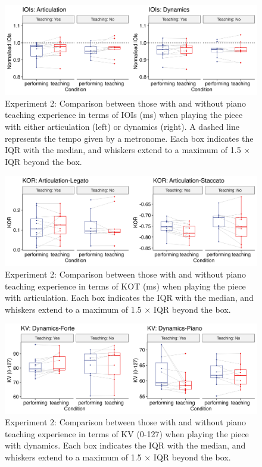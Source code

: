 \documentclass[
  man,floatsintext]{apa6}
\begin{document}
\begin{figure}
\includegraphics[width=1\linewidth]{manuscript_files/figure-latex/plot-ioi-teaching-2-1} \caption{\label{fig:ioi-teaching-2}Experiment 2: Comparison between those with and without piano teaching experience in terms of IOIs (ms) when playing the piece with either articulation (left) or dynamics (right). A dashed line represents the tempo given by a metronome. Each box indicates the IQR with the median, and whiskers extend to a maximum of 1.5 × IQR beyond the box.}\label{fig:plot-ioi-teaching-2}
\end{figure}

\begin{figure}
\includegraphics[width=1\linewidth]{manuscript_files/figure-latex/plot-art-teaching-2-1} \caption{\label{fig:art-teaching-2}Experiment 2:  Comparison between those with and without piano teaching experience in terms of KOT (ms) when playing the piece with articulation. Each box indicates the IQR with the median, and whiskers extend to a maximum of 1.5 × IQR beyond the box.}\label{fig:plot-art-teaching-2}
\end{figure}

\begin{figure}
\includegraphics[width=1\linewidth]{manuscript_files/figure-latex/plot-dyn-teaching-2-1} \caption{\label{fig:dyn-teaching-2}Experiment 2: Comparison between those with and without piano teaching experience in terms of KV (0-127) when playing the piece with dynamics. Each box indicates the IQR with the median, and whiskers extend to a maximum of 1.5 × IQR beyond the box.}\label{fig:plot-dyn-teaching-2}
\end{figure}
\end{document}
